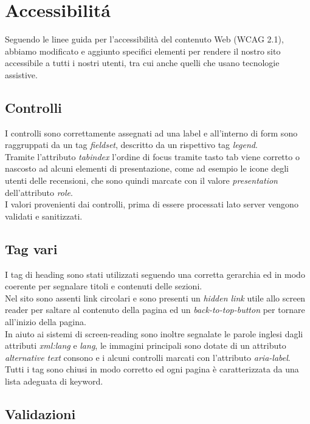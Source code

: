 \section{Accessibilitá}
Seguendo le linee guida per l'accessibilità del contenuto Web (WCAG 2.1), abbiamo modificato e aggiunto specifici elementi per rendere il nostro sito accessibile a tutti i nostri utenti, tra cui anche quelli che usano tecnologie assistive.   
\subsection{Controlli}
I controlli sono correttamente assegnati ad una label e all'interno di form sono raggruppati da un tag \textit{fieldset}, descritto da un rispettivo tag \textit{legend}.\\
Tramite l'attributo \textit{tabindex} l'ordine di focus tramite tasto tab viene corretto o nascosto ad alcuni elementi di presentazione, come ad esempio le icone degli utenti delle recensioni, che sono quindi marcate con il valore \textit{presentation} dell'attributo \textit{role}.\\
I valori provenienti dai controlli, prima di essere processati lato server vengono validati e sanitizzati.

\subsection{Tag vari}
I tag di heading sono stati utilizzati seguendo una corretta gerarchia ed in modo coerente per segnalare titoli e contenuti delle sezioni.\\
Nel sito sono assenti link circolari e sono presenti un \textit{hidden link} utile allo screen reader per saltare al contenuto della pagina ed un \textit{back-to-top-button} per tornare all'inizio della pagina.\\
In aiuto ai sistemi di screen-reading sono inoltre segnalate le parole inglesi dagli attributi \textit{xml:lang} e \textit{lang}, le immagini principali sono dotate di un attributo \textit{alternative text} consono e i alcuni controlli marcati con l'attributo \textit{aria-label}.\\
Tutti i tag sono chiusi in modo corretto ed ogni pagina è caratterizzata da una lista adeguata di keyword.


\subsection{Validazioni}



